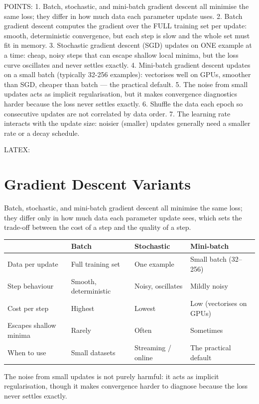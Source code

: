 POINTS:
1. Batch, stochastic, and mini-batch gradient descent all minimise the same loss; they differ in how much data each parameter update uses.
2. Batch gradient descent computes the gradient over the FULL training set per update: smooth, deterministic convergence, but each step is slow and the whole set must fit in memory.
3. Stochastic gradient descent (SGD) updates on ONE example at a time: cheap, noisy steps that can escape shallow local minima, but the loss curve oscillates and never settles exactly.
4. Mini-batch gradient descent updates on a small batch (typically 32-256 examples): vectorises well on GPUs, smoother than SGD, cheaper than batch — the practical default.
5. The noise from small updates acts as implicit regularisation, but it makes convergence diagnostics harder because the loss never settles exactly.
6. Shuffle the data each epoch so consecutive updates are not correlated by data order.
7. The learning rate interacts with the update size: noisier (smaller) updates generally need a smaller rate or a decay schedule.

LATEX:
\section{Gradient Descent Variants}

Batch, stochastic, and mini-batch gradient descent all minimise the same loss; they differ only in how much data each parameter update sees, which sets the trade-off between the cost of a step and the quality of a step.

\begin{center}\begin{tabularx}{\linewidth}{lXXX}
\midrule
 & \textbf{Batch} & \textbf{Stochastic} & \textbf{Mini-batch} \\
\midrule
Data per update & Full training set & One example & Small batch (32--256) \\
Step behaviour & Smooth, deterministic & Noisy, oscillates & Mildly noisy \\
Cost per step & Highest & Lowest & Low (vectorises on GPUs) \\
Escapes shallow minima & Rarely & Often & Sometimes \\
When to use & Small datasets & Streaming / online & The practical default \\
\midrule
\end{tabularx}\end{center}

The noise from small updates is not purely harmful: it acts as implicit regularisation, though it makes convergence harder to diagnose because the loss never settles exactly.


